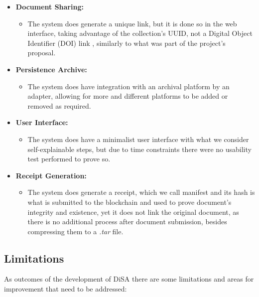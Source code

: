 \documentclass[a4paper,11pt]{article}
\begin{document}
\begin{itemize}
                \item \textbf{Document Sharing:} 
                \begin{itemize}
                    \item The system does generate a unique link, but it is done so in the web interface, taking advantage of the collection's UUID, not a Digital Object Identifier (DOI) link \cite{DOI}, similarly to what was part of the project's proposal.
                \end{itemize} 
                    
                \item \textbf{Persistence Archive:} 
                \begin{itemize}
                    \item The system does have integration with an archival platform by an adapter, allowing for more and different platforms to be added or removed as required.
                \end{itemize}
                        
                \item \textbf{User Interface:} 
                \begin{itemize}
                    \item The system does have a minimalist user interface with what we consider self-explainable steps, but due to time constraints there were no usability test performed to prove so.
                \end{itemize}
                        
                \item \textbf{Receipt Generation:} 
                \begin{itemize}
                    \item The system does generate a receipt, which we call manifest and its hash is what is submitted to the blockchain and used to prove document's integrity and existence, yet it does not link the original document, as there is no additional process after document submission, besides compressing them to a \textit{.tar} file.
                \end{itemize}
            \end{itemize}

        \subsection{Limitations}  \label{sec:limitations}
            \quad As outcomes of the development of DiSA there are some limitations and areas for improvement that need to be addressed:
            
\end{document}
